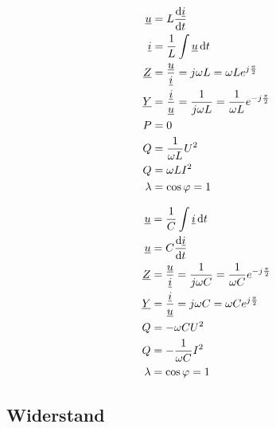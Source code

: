 \begin{boxleft}
\end{boxleft}\begin{boxrightshaded}
\begin{align*}
\underline{u}&=L\frac{\mathop{}\!\mathrm{d}\underline{i}}{\mathop{}\!\mathrm{d} t}\\
\underline{i}&=\frac{1}{L}\int\underline{u}\mathop{}\!\mathrm{d} t\\
\underline{Z}&=\frac{\underline{u}}{\underline{i}}=j\omega L=\omega L e^{j\frac{\pi}{2}}\\
\underline{Y}&=\frac{\underline{i}}{\underline{u}}=\frac{1}{j\omega L}=\frac{1}{\omega L} e^{-j\frac{\pi}{2}}\\
P&=0\\
Q&=\frac{1}{\omega L}U^2\\
Q&=\omega L I^2\\
\lambda&=\cos\varphi=1
\end{align*}
\end{boxrightshaded}

\begin{boxleft}
\end{boxleft}\begin{boxrightshaded}
\begin{align*}
\underline{u}&=\frac{1}{C}\int\underline{i}\mathop{}\!\mathrm{d} t\\
\underline{u}&=C\frac{\mathop{}\!\mathrm{d}\underline{i}}{\mathop{}\!\mathrm{d} t}\\
\underline{Z}&=\frac{\underline{u}}{\underline{i}}=\frac{1}{j\omega C}=\frac{1}{\omega C} e^{-j\frac{\pi}{2}}\\
\underline{Y}&=\frac{\underline{i}}{\underline{u}}=j\omega C=\omega C e^{j\frac{\pi}{2}}\\
Q&=-\omega C U^2\\
Q&=-\frac{1}{\omega C}I^2\\
\lambda&=\cos\varphi=1
\end{align*}
\end{boxrightshaded}

\subsection{Widerstand}

